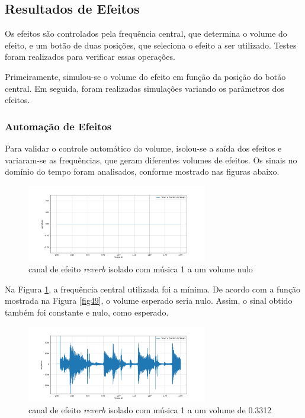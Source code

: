 \newpage
\subsection{Resultados de Efeitos}

Os efeitos são controlados pela frequência central, que determina o volume do efeito, e um botão de duas posições, que seleciona o efeito a ser utilizado. Testes foram realizados para verificar essas operações.

Primeiramente, simulou-se o volume do efeito em função da posição do botão central. Em seguida, foram realizadas simulações variando os parâmetros dos efeitos.

\subsubsection*{Automação de Efeitos}

Para validar o controle automático do volume, isolou-se a saída dos efeitos e variaram-se as frequências, que geram diferentes volumes de efeitos. Os sinais no domínio do tempo foram analisados, conforme mostrado nas figuras abaixo.

\begin{figure}[h]
    \centering
    \includegraphics[width=0.7\textwidth]{figuras/fig66.png}
    \caption{canal de efeito \textit{reverb} isolado com música 1 a um volume nulo}
    \label{fig66}
\end{figure}

Na Figura \ref{fig66}, a frequência central utilizada foi a mínima. De acordo com a função mostrada na Figura \ref{fig49}, o volume esperado seria nulo. Assim, o sinal obtido também foi constante e nulo, como esperado.

\begin{figure}[h]
    \centering
    \includegraphics[width=0.7\textwidth]{figuras/fig67.png}
    \caption{canal de efeito \textit{reverb} isolado com música 1 a um volume de 0.3312}
    \label{fig67}
\end{figure}

